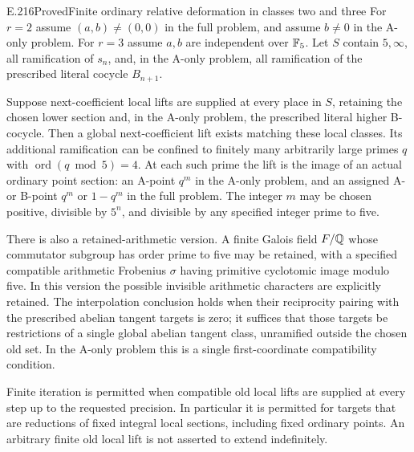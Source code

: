 \begin{result}{E.216}{Proved}{Finite ordinary relative deformation in classes two and three}
For $r=2$ assume $(a,b)\ne(0,0)$ in the full problem, and assume $b\ne0$ in the A-only problem. For $r=3$ assume $a,b$ are independent over $\mathbb F_5$. Let $S$ contain $5,\infty$, all ramification of $s_n$, and, in the A-only problem, all ramification of the prescribed literal cocycle $B_{n+1}$.

Suppose next-coefficient local lifts are supplied at every place in $S$, retaining the chosen lower section and, in the A-only problem, the prescribed literal higher B-cocycle. Then a global next-coefficient lift exists matching these local classes. Its additional ramification can be confined to finitely many arbitrarily large primes $q$ with $\operatorname{ord}(q\bmod5)=4$. At each such prime the lift is the image of an actual ordinary point section: an A-point $q^m$ in the A-only problem, and an assigned A- or B-point $q^m$ or $1-q^m$ in the full problem. The integer $m$ may be chosen positive, divisible by $5^n$, and divisible by any specified integer prime to five.

There is also a retained-arithmetic version. A finite Galois field $F/\mathbb Q$ whose commutator subgroup has order prime to five may be retained, with a specified compatible arithmetic Frobenius $\sigma$ having primitive cyclotomic image modulo five. In this version the possible invisible arithmetic characters are explicitly retained. The interpolation conclusion holds when their reciprocity pairing with the prescribed abelian tangent targets is zero; it suffices that those targets be restrictions of a single global abelian tangent class, unramified outside the chosen old set. In the A-only problem this is a single first-coordinate compatibility condition.

Finite iteration is permitted when compatible old local lifts are supplied at every step up to the requested precision. In particular it is permitted for targets that are reductions of fixed integral local sections, including fixed ordinary points. An arbitrary finite old local lift is not asserted to extend indefinitely.
\end{result}

